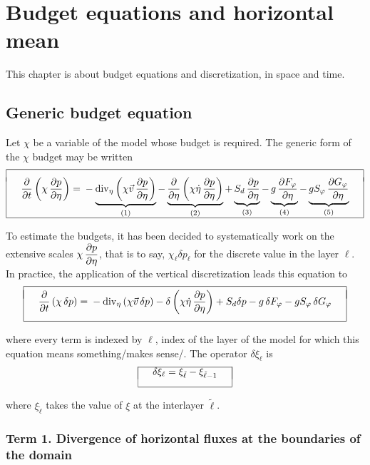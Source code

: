 \chapter{Budget equations and horizontal mean}
\null
\vspace{1cm}
This chapter is about budget equations and discretization, in space and time. 
\section{Generic budget equation}
Let $\chi$ be a variable of the model whose budget is required. The generic form of the $\chi$ budget may be written
$$ \bay{|c|} \hline \\[-1ex]
\quad \ds \DerP{}t \lp \chi\,\DerP p{\eta} \rp = \mb - \underbrace{\divi{\eta} \lp \chi\vec v \,\DerP 
p{\eta} \rp}_{(1)} - \underbrace{\DerP{}{\eta} \lp \chi \dot\eta\,\DerP p{\eta} \rp}_{(2)} + \underbrace{S_d 
\,\DerP p{\eta}}_{(3)} - \underbrace{g\,\DerP{F_\varphi}{\eta}}_{(4)} - \underbrace{g S_\varphi\,\DerP{G_\varphi}{\eta}}_{(5)} 
\quad \\[5ex]
\hline \eay $$

To estimate the budgets, it has been decided to systematically work on the extensive scales $\ds \chi\,\DerP p{\eta}$,  that is to say, $\chi_\ell \delta p_\ell$ for the discrete value in the layer $\ell$. In practice, the application of the vertical discretization leads this equation to 
$$ \bay{|c|} \hline \\[-2ex]
\quad \ds \DerP{}t \lp \chi\,\delta p \rp = \mb - \divi{\eta} \lp \chi\vec v \,\delta p \rp - \delta 
\lp \chi \dot\eta\,\DerP p{\eta} \rp + S_d \delta p - g\,\delta F_\varphi - g S_\varphi\,\delta G_\varphi 
\quad \\[3ex]
\hline \eay $$

\noi where every term is indexed by $\ell$, index of the layer of the model for which this equation means something/makes sense/. The operator $\delta \xi_\ell$ is
$$ \bay{|c|} \hline \\[-3ex] \quad \delta \xi_\ell = \xi_{\tilde\ell} - \xi_{\tilde\ell-1} \quad \\[2ex]  
\hline \eay $$

where $\xi_{\tilde\ell}$ takes the value of $\xi$ at the interlayer $\tilde \ell$.

\subsection{Term 1. Divergence of horizontal fluxes at the boundaries of the domain}

